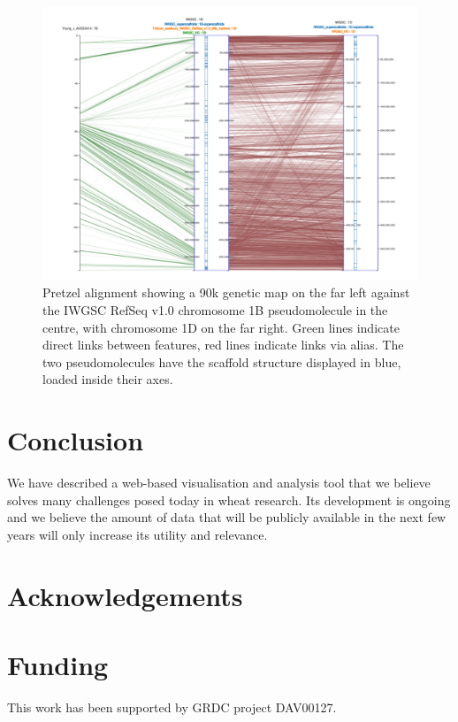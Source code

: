 \documentclass{bioinfo}
\begin{document}
\begin{figure}[!tpb]%
\centerline{\includegraphics[width=.55\textwidth]{pretzel.png}}
\caption{
  Pretzel alignment showing a 90k genetic map on the far left against the IWGSC RefSeq v1.0 chromosome 1B pseudomolecule in the centre, 
  with chromosome 1D on the far right. 
  Green lines indicate direct links between features, red lines indicate links via alias. 
  The two pseudomolecules have the scaffold structure displayed in blue, loaded inside their axes.
}
\label{fig:01}
\end{figure}




%
%






\section{Conclusion}

We have described a web-based visualisation and analysis tool that we believe solves many challenges posed today in wheat research. 
Its development is ongoing and we believe the amount of data that will be publicly available in the next few years will only increase its utility and relevance.

\section*{Acknowledgements}


\section*{Funding}

This work has been supported by GRDC project DAV00127.\vspace*{-12pt}




\end{document}
